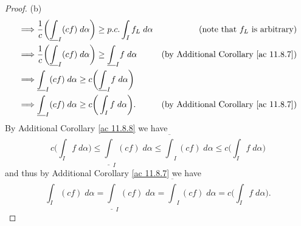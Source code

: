 \begin{proof}{(b)}
\begin{align*}
        \implies & \frac{1}{c} \bigg(\underline{\int}_I (cf) \; d \alpha\bigg) \geq p.c. \int_I f_L \; d \alpha      & \text{(note that \(f_L\) is arbitrary)}             \\
        \implies & \frac{1}{c} \bigg(\underline{\int}_I (cf) \; d \alpha\bigg) \geq \underline{\int}_I f \; d \alpha & \text{(by Additional Corollary \ref{ac 11.8.7})}    \\
        \implies & \underline{\int}_I (cf) \; d \alpha \geq c\bigg(\underline{\int}_I f \; d \alpha\bigg)                                                                  \\
        \implies & \underline{\int}_I (cf) \; d \alpha \geq c\bigg(\int_I f \; d \alpha\bigg).                       & \text{(by Additional Corollary \ref{ac 11.8.7})}
    \end{align*}
    By Additional Corollary \ref{ac 11.8.8} we have
    \[
        c\bigg(\int_I f \; d \alpha\bigg) \leq \underline{\int}_I (cf) \; d \alpha \leq \overline{\int}_I (cf) \; d \alpha \leq c\bigg(\int_I f \; d \alpha\bigg)
    \]
    and thus by Additional Corollary \ref{ac 11.8.7} we have
    \[
        \int_I (cf) \; d \alpha = \underline{\int}_I (cf) \; d \alpha = \overline{\int}_I (cf) \; d \alpha = c\bigg(\int_I f \; d \alpha\bigg).
    \]


\end{proof}
